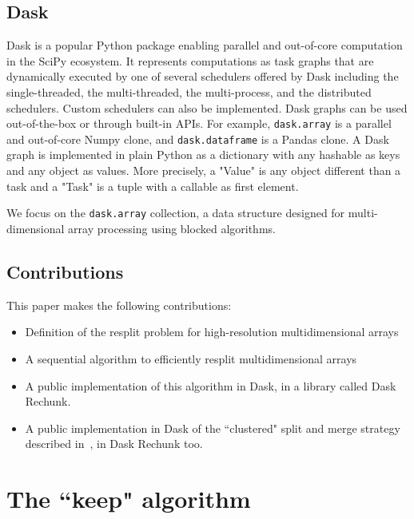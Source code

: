 \documentclass[conference]{IEEEtran}
\begin{document}
\subsection{Dask}

Dask is a popular Python package enabling parallel and out-of-core
computation in the SciPy ecosystem. It represents computations as task
graphs that are dynamically executed by one of several schedulers offered
by Dask including the single-threaded, the multi-threaded, the
multi-process, and the distributed schedulers. Custom schedulers can also
be implemented. Dask graphs can be used out-of-the-box or through built-in
APIs. For example, \texttt{dask.array} is a parallel and out-of-core Numpy
clone, and
\texttt{dask.dataframe} is a Pandas clone. A Dask graph is implemented in
plain Python as a dictionary with any hashable as keys and any object as
values. More precisely, a "Value" is any object different than a task and a
"Task" is a tuple with a callable as first element.

We focus on the \texttt{dask.array} collection, a data structure designed for
multi-dimensional array processing using blocked algorithms.

\subsection{Contributions}
This paper makes the following contributions:
\begin{itemize}
  \item Definition of the resplit problem for high-resolution multidimensional arrays
  \item A sequential algorithm to efficiently resplit multidimensional arrays
  \item A public implementation of this algorithm in Dask, in a library called Dask Rechunk.
  \item A public implementation in Dask of the ``clustered" split and merge strategy described in~\cite{seqalgorithms}, in Dask Rechunk too.
\end{itemize}

\section{The ``keep" algorithm}
\end{document}
